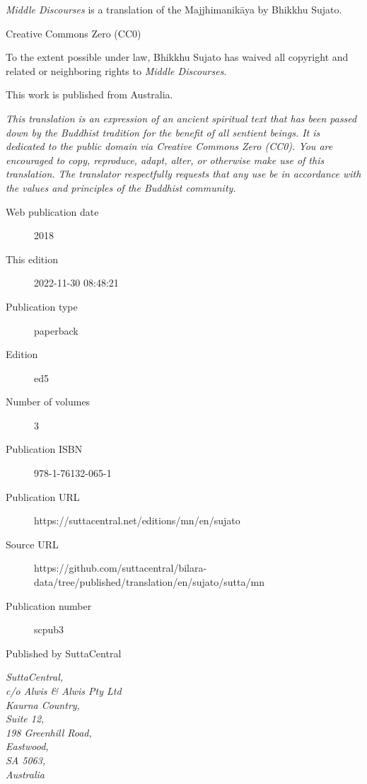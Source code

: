 \documentclass[12pt,openany]{book}%
\begin{document}
\begin{footnotesize}

\textit{Middle Discourses} is a translation of the Majjhimanikāya by Bhikkhu Sujato.

\medskip

Creative Commons Zero (CC0)

To the extent possible under law, Bhikkhu Sujato has waived all copyright and related or neighboring rights to \textit{Middle Discourses}.

\medskip

This work is published from Australia.

\begin{center}
\textit{This translation is an expression of an ancient spiritual text that has been passed down by the Buddhist tradition for the benefit of all sentient beings. It is dedicated to the public domain via Creative Commons Zero (CC0). You are encouraged to copy, reproduce, adapt, alter, or otherwise make use of this translation. The translator respectfully requests that any use be in accordance with the values and principles of the Buddhist community.}
\end{center}

\medskip

\begin{description}
    \item[Web publication date] 2018
    \item[This edition] 2022-11-30 08:48:21
    \item[Publication type] paperback
    \item[Edition] ed5
    \item[Number of volumes] 3
    \item[Publication ISBN] 978-1-76132-065-1
    \item[Publication URL] https://suttacentral.net/editions/mn/en/sujato
    \item[Source URL] https://github.com/suttacentral/bilara-data/tree/published/translation/en/sujato/sutta/mn
    \item[Publication number] scpub3
\end{description}

\medskip

Published by SuttaCentral

\medskip

\textit{SuttaCentral,\\
c/o Alwis \& Alwis Pty Ltd\\
Kaurna Country,\\
Suite 12,\\
198 Greenhill Road,\\
Eastwood,\\
SA 5063,\\
Australia}

\end{footnotesize}
\end{document}
